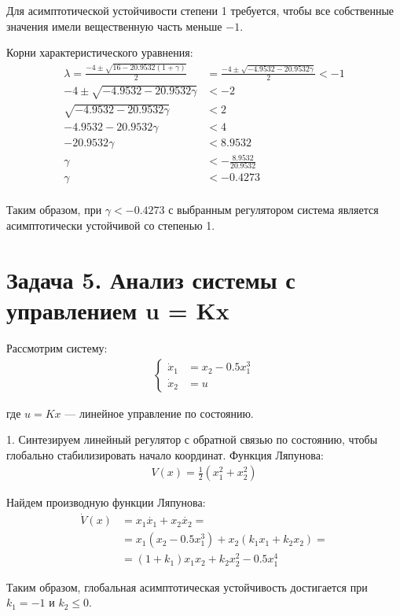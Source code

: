 Для асимптотической устойчивости степени 1 требуется, чтобы все 
собственные значения имели вещественную часть меньше $-1$.

Корни характеристического уравнения:
\begin{align*}
\lambda = \frac{-4 \pm \sqrt{16 - 20.9532(1+\gamma)}}{2} &= \frac{-4 \pm \sqrt{-4.9532-20.9532\gamma}}{2} < -1 \\
-4 \pm \sqrt{-4.9532-20.9532\gamma} &< -2 \\
\sqrt{-4.9532-20.9532\gamma} &< 2 \\
-4.9532-20.9532\gamma &< 4 \\
-20.9532\gamma &< 8.9532 \\
\gamma &< -\frac{8.9532}{20.9532} \\
\gamma &< -0.4273 \\
\end{align*}

Таким образом, при $\gamma<-0.4273$ с выбранным регулятором система является асимптотически устойчивой со степенью 1. 

\section*{Задача 5. Анализ системы с управлением u = Kx}

Рассмотрим систему:
\begin{align*}
    \begin{cases}
        \dot{x}_1 &= x_2 - 0.5x_1^3 \\
        \dot{x}_2 &= u
    \end{cases}
\end{align*}

где $u = Kx$ — линейное управление по состоянию.

1. Синтезируем линейный регулятор с обратной связью по
состоянию, чтобы глобально стабилизировать начало
координат.
Функция Ляпунова:
\begin{align*}
    V(x) = \frac{1}{2} \left( x_1^2 + x_2^2 \right)
\end{align*}

Найдем производную функции Ляпунова:
\begin{align*}
    \dot{V}(x) &= x_1 \dot{x_1} + x_2 \dot{x_2} = \\
    &= x_1(x_2 - 0.5x_1^3) + x_2(k_1x_1 + k_2x_2) = \\
    &= (1 + k_1)x_1x_2 + k_2x_2^2 - 0.5x_1^4
\end{align*}

Таким образом, глобальная асимптотическая устойчивость достигается при $k_1 = -1$ и $k_2 \le 0$.

